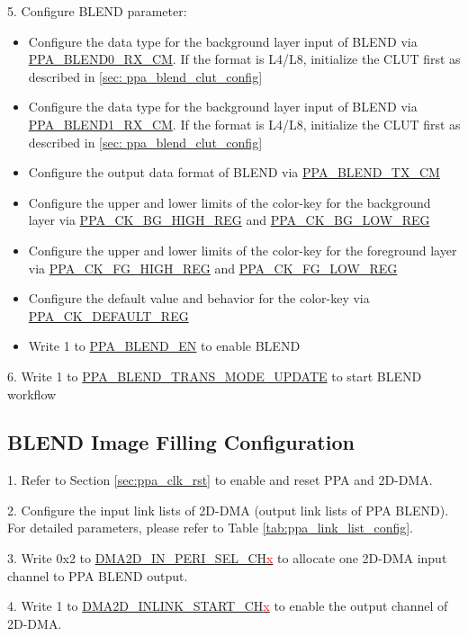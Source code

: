 \documentclass[main\_\_EN.tex]{subfiles}
\begin{document}
5. Configure BLEND parameter:
\begin{itemize}
    \item Configure the data type for the background layer input of BLEND via \hyperref[fielddesc:PPABLEND0RXCM]{PPA\_BLEND0\_RX\_CM}. If the format is L4/L8, initialize the CLUT first as described in \ref{sec: ppa_blend_clut_config}
    \item Configure the data type for the background layer input of BLEND via \hyperref[fielddesc:PPABLEND1RXCM]{PPA\_BLEND1\_RX\_CM}. If the format is L4/L8, initialize the CLUT first as described in \ref{sec: ppa_blend_clut_config}
    \item Configure the output data format of BLEND via \hyperref[fielddesc:PPABLENDTXCM]{PPA\_BLEND\_TX\_CM}
    \item Configure the upper and lower limits of the color-key for the background layer via \hyperref[regdesc:PPACKBGHIGHREG]{PPA\_CK\_BG\_HIGH\_REG} and \hyperref[regdesc:PPACKBGLOWREG]{PPA\_CK\_BG\_LOW\_REG}
    \item Configure the upper and lower limits of the color-key for the foreground layer via \hyperref[regdesc:PPACKFGHIGHREG]{PPA\_CK\_FG\_HIGH\_REG} and \hyperref[regdesc:PPACKFGLOWREG]{PPA\_CK\_FG\_LOW\_REG}
    \item Configure the default value and behavior for the color-key via \hyperref[regdesc:PPACKDEFAULTREG]{PPA\_CK\_DEFAULT\_REG}
    \item Write 1 to \hyperref[fielddesc:PPABLENDEN]{PPA\_BLEND\_EN} to enable BLEND
\end{itemize}

6. Write 1 to \hyperref[fielddesc:PPABLENDTRANSMODEUPDATE]{PPA\_BLEND\_TRANS\_MODE\_UPDATE} to start BLEND workflow

\subsection{BLEND Image Filling Configuration}
1. Refer to Section \ref{sec:ppa_clk_rst} to enable and reset PPA and 2D-DMA.

2. Configure the input link lists of 2D-DMA (output link lists of PPA BLEND). For detailed parameters, please refer to Table \ref{tab:ppa_link_list_config}.

3. Write 0x2 to \hyperref[fielddesc:DMA2DINPERISELCHN]{DMA2D\_IN\_PERI\_SEL\_CH\textcolor{red}{x}} to allocate one 2D-DMA input channel to PPA BLEND output.

4. Write 1 to \hyperref[fielddesc:DMA2DINLINKSTARTCHN]{DMA2D\_INLINK\_START\_CH\textcolor{red}{x}} to enable the output channel of 2D-DMA.
\end{document}

